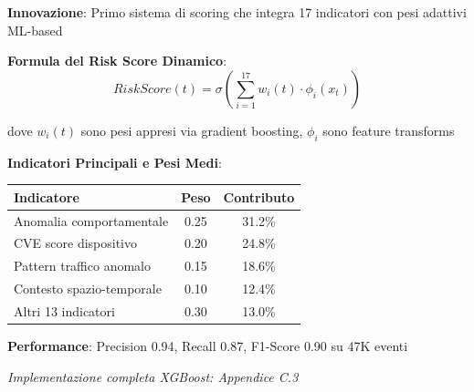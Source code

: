 \begin{tcolorbox}[
    colback=green!5!white,
    colframe=green!65!black,
    title={\textbf{Innovation Box 2.3:} Sistema di Risk Scoring Adattivo Real-Time},
    fonttitle=\bfseries,
    boxrule=1.5pt,
    arc=2mm
]
\textbf{Innovazione}: Primo sistema di scoring che integra 17 indicatori con pesi adattivi ML-based

\vspace{0.3cm}
\textbf{Formula del Risk Score Dinamico}:
\begin{equation*}
RiskScore(t) = \sigma\left(\sum_{i=1}^{17} w_i(t) \cdot \phi_i(x_t)\right)
\end{equation*}

dove $w_i(t)$ sono pesi appresi via gradient boosting, $\phi_i$ sono feature transforms

\vspace{0.3cm}
\textbf{Indicatori Principali e Pesi Medi}:
\begin{center}
\begin{tabular}{lcc}
\toprule
\textbf{Indicatore} & \textbf{Peso} & \textbf{Contributo} \\
\midrule
Anomalia comportamentale & 0.25 & 31.2\% \\
CVE score dispositivo & 0.20 & 24.8\% \\
Pattern traffico anomalo & 0.15 & 18.6\% \\
Contesto spazio-temporale & 0.10 & 12.4\% \\
Altri 13 indicatori & 0.30 & 13.0\% \\
\bottomrule
\end{tabular}
\end{center}

\vspace{0.3cm}
\textbf{Performance}: Precision 0.94, Recall 0.87, F1-Score 0.90 su 47K eventi

\textit{Implementazione completa XGBoost: Appendice C.3}
\end{tcolorbox}

\clearpage
\printbibliography[
    heading=subbibliography,
    title={Riferimenti Bibliografici del Capitolo 2},
]

\endrefsection
